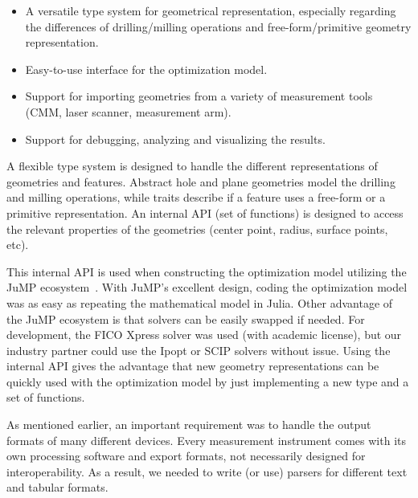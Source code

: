 \documentclass{juliacon}
\begin{document}
\begin{itemize}
	\item A versatile type system for geometrical representation, especially regarding the differences of drilling/milling operations and free-form/primitive geometry representation.
	\item Easy-to-use interface for the optimization model.
	\item Support for importing geometries from a variety of measurement tools (CMM, laser scanner, measurement arm).
	\item Support for debugging, analyzing and visualizing the results.
\end{itemize}

A flexible type system is designed to handle the different representations of geometries and features.
Abstract hole and plane geometries model the drilling and milling operations, while traits describe if a feature uses a free-form or a primitive representation.
An internal API (set of functions) is designed to access the relevant properties of the geometries (center point, radius, surface points, etc).

This internal API is used when constructing the optimization model utilizing the JuMP ecosystem~\cite{Lubin2023}.
With JuMP's excellent design, coding the optimization model was as easy as repeating the mathematical model in Julia.
Other advantage of the JuMP ecosystem is that solvers can be easily swapped if needed.
For development, the FICO Xpress solver was used (with academic license), but our industry partner could use the Ipopt or SCIP solvers without issue.
Using the internal API gives the advantage that new geometry representations can be quickly used with the optimization model by just implementing a new type and a set of functions.

As mentioned earlier, an important requirement was to handle the output formats of many different devices.
Every measurement instrument comes with its own processing software and export formats, not necessarily designed for interoperability.
As a result, we needed to write (or use) parsers for different text and tabular formats.
\end{document}
